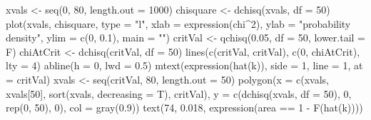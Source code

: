 \begin{Schunk}
\begin{Sinput}
 xvals <- seq(0, 80, length.out = 1000)
 chisquare <- dchisq(xvals, df = 50)
 plot(xvals, chisquare, type = "l", xlab = expression(chi^2), ylab = "probability density", 
      ylim = c(0, 0.1), main = "")
 critVal <- qchisq(0.05, df = 50, lower.tail = F)
 chiAtCrit <- dchisq(critVal, df = 50)
 lines(c(critVal, critVal), c(0, chiAtCrit), lty = 4)
 abline(h = 0, lwd = 0.5)
 mtext(expression(hat(k)), side = 1, line = 1, at = critVal)
 xvals <- seq(critVal, 80, length.out = 50)
 polygon(x = c(xvals, xvals[50], sort(xvals, decreasing = T), critVal), y = c(dchisq(xvals, 
      df = 50), 0, rep(0, 50), 0), col = gray(0.9))
 text(74, 0.018, expression(area == 1 - F(hat(k))))
\end{Sinput}
\end{Schunk}
